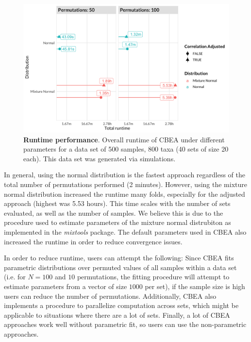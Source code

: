 \documentclass{article}
\begin{document}
\begin{figure}[!h]
    \centering
    \includegraphics[width=\textwidth]{figures/performance.png}
    \caption{\textbf{Runtime performance}. Overall runtime of CBEA under different parameters for a data set of 500 samples, 800 taxa (40 sets of size 20 each). This data set was generated via simulations.} 
    \label{fig:s6}
\end{figure}

In general, using the normal distribution is the fastest approach regardless of the total number of permutations performed (2 minutes). However, using the mixture normal distribution increased the runtime many folds, especially for the adjusted approach (highest was 5.53 hours). This time scales with the number of sets evaluated, as well as the number of samples. We believe this is due to the procedure used to estimate parameters of the mixture normal distrubiton as implemented in the \emph{mixtools} package. The default parameters used in CBEA also increased the runtime in order to reduce convergence issues.  

In order to reduce runtime, users can attempt the following: Since CBEA fits parametric distributions over permuted values of all samples within a data set (i.e. for $N = 100$ and $10$ permutations, the fitting procedure will attempt to estimate parameters from a vector of size $1000$ per set), if the sample size is high users can reduce the number of permutations. Additionally, CBEA also implements a procedure to parallelize computation across sets, which might be applicable to situations where there are a lot of sets. Finally, a lot of CBEA approaches work well without parametric fit, so users can use the non-parametric approaches. 

\clearpage
{}

\end{document}
